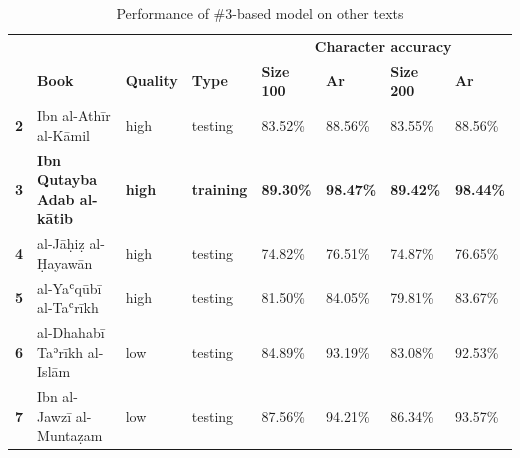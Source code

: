 \begin{subappendices}
\begin{table}[H]
\begin{minipage}{\textwidth}
\begin{center}
\caption{Performance of \#3-based model on other texts}
\label{tab:soa_atab2}
\renewcommand*{\thefootnote}{\alph{footnote}}
\begin{tabularx}{\textwidth}{lp{2.2cm}XXXXXX} \toprule
& & & & \multicolumn{4}{c}{\textbf{Character accuracy}}\\
\cline{5-8}
& \textbf{Book}& \textbf{Quality} & \textbf{Type} & \textbf{Size 100} & \textbf{Ar}& \textbf{Size 200} & \textbf{Ar}\\\midrule
\textbf{2} & Ibn al-Athīr \newline\scriptsize{al-Kāmil} &  	  high& testing & 83.52\% & 88.56\% & 83.55\% & 88.56\%\\
\textbf{3} & \textbf{Ibn Qutayba \newline\scriptsize{Adab al-kātib}} & \textbf{high}& \textbf{training} & \textbf{89.30\%} & \textbf{98.47\%} & \textbf{89.42\%} & \textbf{98.44\%} \\
\textbf{4} & al-Jāḥiẓ \newline\scriptsize{al-Ḥayawān} & 	  high& testing & 74.82\% & 76.51\% & 74.87\% & 76.65\%\\
\textbf{5} & al-Yaʿqūbī \newline\scriptsize{al-Taʿrīkh} & 	  high& testing & 81.50\% & 84.05\% & 79.81\% & 83.67\%\\
\textbf{6} & al-Dhahabī \newline\scriptsize{Taʾrīkh al-Islām}  & low& testing	& 84.89\% & 93.19\% & 83.08\% & 92.53\%\\
\textbf{7} & Ibn al-Jawzī \newline\scriptsize{al-Muntaẓam} &    low& testing & 87.56\% & 94.21\% & 86.34\% & 93.57\%\\
\bottomrule
\end{tabularx}
\end{center}
\end{minipage}
\end{table}


\end{subappendices}
